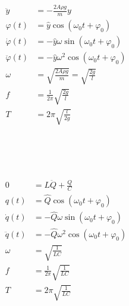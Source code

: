 \begin{boxleft}
\\
\\
\\
\\
\\
\end{boxleft}\begin{boxrightshaded}
\begin{align}
\ddot{y}&=-\frac{2A\rho g}{m}y\\
\varphi(t)&=\hat{y}\cos(\omega_0 t+\varphi_0)\\
\dot{\varphi}(t)&=-\hat{y}\omega\sin(\omega_0 t+\varphi_0)\\
\ddot{\varphi}(t)&=-\hat{y}\omega^2\cos(\omega_0 t+\varphi_0)\\
\omega&=\sqrt{\frac{2A\rho g}{m}}=\sqrt{\frac{2g}{l}}\\
f&=\frac{1}{2\pi}\sqrt{\frac{2g}{l}}\\
T&=2\pi\sqrt{\frac{l}{2g}}
\end{align}
\end{boxrightshaded}

\begin{boxleft}
\\
\\
\\
\end{boxleft}\begin{boxrightshaded}
\begin{align}
0&=L\ddot{Q}+\frac{Q}{C}\\
q(t)&=\hat{Q}\cos(\omega_0 t+\varphi_0)\\
\dot{q}(t)&=-\hat{Q}\omega\sin(\omega_0 t+\varphi_0)\\
\ddot{q}(t)&=-\hat{Q}\omega^2\cos(\omega_0 t+\varphi_0)\\
\omega&=\sqrt{\frac{1}{LC}}\\
f&=\frac{1}{2\pi}\sqrt{\frac{1}{LC}}\\
T&=2\pi\sqrt{\frac{1}{LC}}
\end{align}
\end{boxrightshaded}

